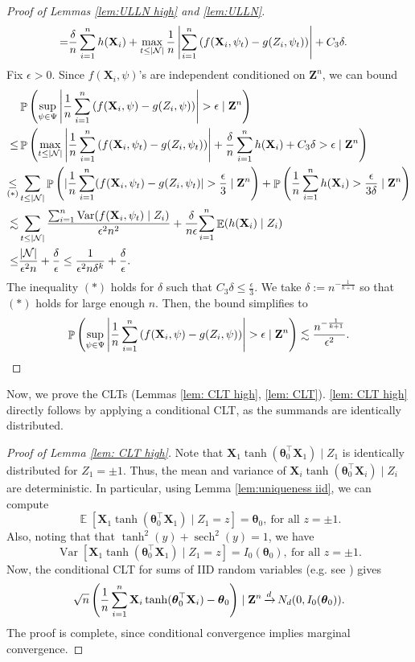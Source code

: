 \documentclass[preprint,reqno]{imsart}
\newcommand{\ttheta}{\boldsymbol{\theta}}
\DeclareMathOperator{\xd}{\xrightarrow{\mathnormal d}}
\DeclareMathOperator{\sech}{sech}
\DeclareMathOperator{\EE}{\mathbb{E}}
\DeclareMathOperator{\Var}{Var}
\DeclareMathOperator{\PP}{\mathbb{P}}
\newcommand{\Z}{\mathbf{Z}}
\newcommand{\X}{\mathbf{X}}
\DeclareMathOperator{\sumin}{\sum_{\mathnormal i=1}^{\mathnormal n}}
\begin{document}
\begin{appendix}
\begin{proof}[Proof of Lemmas \ref{lem:ULLN high} and \ref{lem:ULLN}]
\begin{align*}
        = & \frac{\delta}{n} \sumin h(\X_i) + \max_{t \le |\mathcal{N}|} \frac{1}{n}\left|  \sumin \left( f(\X_i, \psi_t) - g(Z_i, \psi_t) \right) \right| + C_3 \delta.
    \end{align*}
    Fix $\epsilon > 0$. Since $f(\X_i, \psi)$'s are independent conditioned on $\Z^n$, we can bound 
    \begin{align*}
    &\PP \left(\sup_{\psi \in \Psi} \left| \frac{1}{n} \sumin \left( f(\X_i, \psi) -g(Z_i, \psi) \right) \right| > \epsilon \mid \Z^n \right) \\
    \le & \PP \left( \max_{t \le |\mathcal{N}|} \left| \frac{1}{n} \sumin \left( f(\X_i, \psi_t) -g(Z_i, \psi_t) \right) \right| + \frac{\delta}{n} \sumin h(\X_i) + C_3 \delta > \epsilon  \mid \Z^n \right) \\
    \underset{(*)}{\le} & \sum_{t \le |\mathcal{N}|} \PP\left( |\frac{1}{n} \sumin (f(\X_i,\psi_t) - g(Z_i, \psi_t)|> \frac{\epsilon}{3} \mid \Z^n \right) +  \PP \left( \frac{1}{n} \sumin h(\X_i) > \frac{\epsilon}{3\delta} \mid \Z^n \right)  \\
    \lesssim & \sum_{t \le |\mathcal{N}|} \frac{\sumin \Var(f(\X_i, \psi_t) \mid Z_i)}{\epsilon^2 n^2} + \frac{\delta}{n\epsilon} {\sumin \EE (h(\X_i) \mid Z_i)} \\
    {\le} & \frac{|\mathcal{N}|}{\epsilon^2 n} + \frac{\delta}{\epsilon} \le \frac{1}{\epsilon^2 n \delta^k} + \frac{\delta}{\epsilon}.
    \end{align*}
    The inequality $(*)$ holds for $\delta$ such that $C_3 \delta \le \frac{\epsilon}{3}$. We take $\delta := n^{-\frac{1}{k+1}}$ so that $(*)$ holds for large enough $n$. Then, the bound simplifies to
    $$\PP \left(\sup_{\psi \in \Psi} \left| \frac{1}{n} \sumin \left( f(\X_i, \psi) -g(Z_i, \psi) \right) \right| > \epsilon \mid \Z^n \right) \lesssim \frac{n^{-\frac{1}{k+1} }}{\epsilon^2}.$$
\end{proof}

%
Now, we prove the CLTs (Lemmas \ref{lem: CLT high}, \ref{lem: CLT}). \cref{lem: CLT high} directly follows by applying a conditional CLT, as the summands are identically distributed.
\begin{proof}[Proof of Lemma \ref{lem: CLT high}]
    Note that $\X_1 \tanh(\ttheta_0^\top \X_1) \mid Z_1$ is identically distributed for $Z_1 = \pm 1$. Thus, the mean and variance of $\X_i \tanh(\ttheta_0^\top \X_i) \mid Z_i$ are deterministic. In particular, using Lemma \ref{lem:uniqueness iid}, we can compute
    $$\EE [\X_1 \tanh(\ttheta_0^\top \X_1) \mid Z_1 = z] = \ttheta_0, ~ \mbox{for all } z = \pm 1.$$ 
    Also, noting that that $\tanh^2(y) + \sech^2(y) = 1$, we have
    $$\Var [\X_1 \tanh(\ttheta_0^\top \X_1) \mid Z_1 = z] = I_0(\ttheta_0), ~ \mbox{for all } z = \pm 1.$$
    Now, the conditional CLT for sums of IID random variables (e.g. see \cite{bulinski2017conditional}) gives 
    $$\sqrt{n} \left(\frac{1}{n} \sumin \X_i \tanh(\ttheta_0^\top \X_i) - \ttheta_0 \right) \mid \Z^n \xd N_d(0, I_0(\ttheta_0)).$$
    The proof is complete, since conditional convergence implies marginal convergence.
\end{proof}


\end{appendix}
\end{document}
